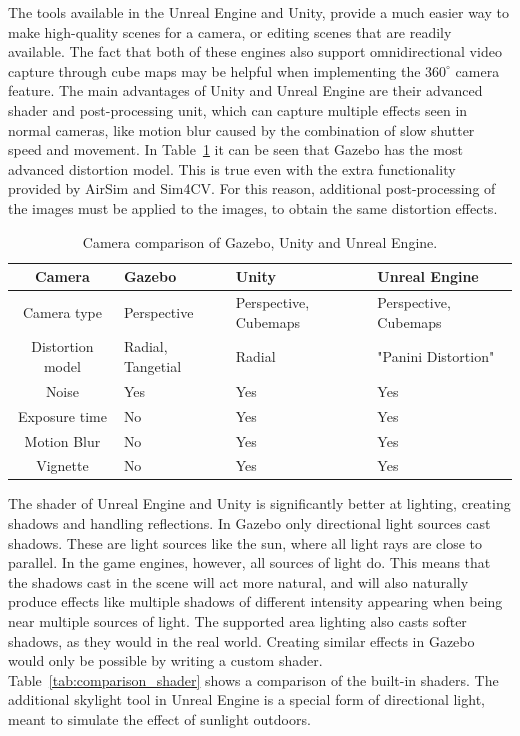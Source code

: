 The tools available in the Unreal Engine and Unity, provide a much easier way to make high-quality scenes for a camera, or editing scenes that are readily available. The fact that both of these engines also support omnidirectional video capture through cube maps may be helpful when implementing the $360^\circ$ camera feature. The main advantages of Unity and Unreal Engine are their advanced shader and post-processing unit, which can capture multiple effects seen in normal cameras, like motion blur caused by the combination of slow shutter speed and movement. In Table~\ref{tab:comparison_camera} it can be seen that Gazebo has the most advanced distortion model. This is true even with the extra functionality provided by AirSim and Sim4CV. For this reason, additional post-processing of the images must be applied to the images, to obtain the same distortion effects.

\begin{table}[!htb]
    \centering
    \caption{Camera comparison of Gazebo, Unity and Unreal Engine.}
    \label{tab:comparison_camera}
    \begin{tabular}{|c|>{\centering\arraybackslash}m{4cm}|>{\centering\arraybackslash}m{4cm}|>{\centering\arraybackslash}m{4cm}|} \hline
        \textbf{Camera} & \textbf{Gazebo} & \textbf{Unity} & \textbf{Unreal Engine} \\ \hline\hline
        Camera type     & Perspective & Perspective, Cubemaps & Perspective, Cubemaps \\ \hline
        Distortion model & Radial, Tangetial & Radial  & "Panini Distortion"\cite{panini} \\ \hline
        Noise           & Yes & Yes & Yes \\ \hline
        Exposure time   & No & Yes & Yes \\ \hline
        Motion Blur     & No & Yes & Yes \\ \hline
        Vignette        & No & Yes & Yes \\ \hline
        
    \end{tabular}
\end{table}

The shader of Unreal Engine and Unity is significantly better at lighting, creating shadows and handling reflections. In Gazebo only directional light sources cast shadows. These are light sources like the sun, where all light rays are close to parallel. In the game engines, however, all sources of light do. This means that the shadows cast in the scene will act more natural, and will also naturally produce effects like multiple shadows of different intensity appearing when being near multiple sources of light. The supported area lighting also casts softer shadows, as they would in the real world. Creating similar effects in Gazebo would only be possible by writing a custom shader. Table~\ref{tab:comparison_shader} shows a comparison of the built-in shaders. The additional skylight tool in Unreal Engine is a special form of directional light, meant to simulate the effect of sunlight outdoors.

